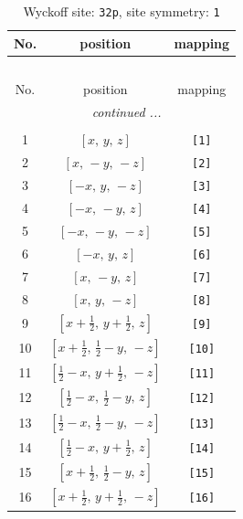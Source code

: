 \documentclass[fleqn,8pt]{jsarticle}
\begin{document}
\renewcommand{\arraystretch}{1.2}
\begin{longtable}{ccc}
\caption{Wyckoff site: {\tt 32p}, site symmetry: {\tt 1}}
 \\
 \hline \hline
No. & position & mapping \\ \hline \endfirsthead

\multicolumn{2}{l}{\tablename\ \thetable{}} \\
 \hline \hline
No. & position & mapping \\ \hline \endhead

 \hline \hline
\multicolumn{2}{r}{\footnotesize\it continued ...} \\ \endfoot

 \hline \hline
\multicolumn{2}{r}{} \\ \endlastfoot

1 & $\left[ x,\, y,\, z \right]$ & {\tt [1]} \\ \hline
2 & $\left[ x,\, - y,\, - z \right]$ & {\tt [2]} \\ \hline
3 & $\left[ - x,\, y,\, - z \right]$ & {\tt [3]} \\ \hline
4 & $\left[ - x,\, - y,\, z \right]$ & {\tt [4]} \\ \hline
5 & $\left[ - x,\, - y,\, - z \right]$ & {\tt [5]} \\ \hline
6 & $\left[ - x,\, y,\, z \right]$ & {\tt [6]} \\ \hline
7 & $\left[ x,\, - y,\, z \right]$ & {\tt [7]} \\ \hline
8 & $\left[ x,\, y,\, - z \right]$ & {\tt [8]} \\ \hline
9 & $\left[ x + \frac{1}{2},\, y + \frac{1}{2},\, z \right]$ & {\tt [9]} \\ \hline
10 & $\left[ x + \frac{1}{2},\, \frac{1}{2} - y,\, - z \right]$ & {\tt [10]} \\ \hline
11 & $\left[ \frac{1}{2} - x,\, y + \frac{1}{2},\, - z \right]$ & {\tt [11]} \\ \hline
12 & $\left[ \frac{1}{2} - x,\, \frac{1}{2} - y,\, z \right]$ & {\tt [12]} \\ \hline
13 & $\left[ \frac{1}{2} - x,\, \frac{1}{2} - y,\, - z \right]$ & {\tt [13]} \\ \hline
14 & $\left[ \frac{1}{2} - x,\, y + \frac{1}{2},\, z \right]$ & {\tt [14]} \\ \hline
15 & $\left[ x + \frac{1}{2},\, \frac{1}{2} - y,\, z \right]$ & {\tt [15]} \\ \hline
16 & $\left[ x + \frac{1}{2},\, y + \frac{1}{2},\, - z \right]$ & {\tt [16]} \\ \hline

\end{longtable}
\end{document}
